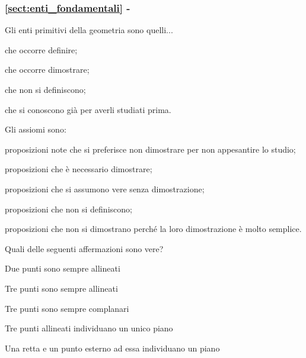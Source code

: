 \begingroup
\hypersetup{linkcolor=black}
\subsubsection*{\ref{sect:enti_fondamentali} - 
}
\endgroup

\begin{esercizio}
\label{ese:1.33}
Gli enti primitivi della geometria sono quelli...
\begin{enumeratea}
\item che occorre definire;
\item che occorre dimostrare;
\item che non si definiscono;
\item che si conoscono già per averli studiati prima.
\end{enumeratea}
\end{esercizio}

\begin{esercizio}
\label{ese:1.34}
Gli assiomi sono:
\begin{enumeratea}
\item proposizioni note che si preferisce non dimostrare per non 
appesantire lo studio;
\item proposizioni che è necessario dimostrare;
\item proposizioni che si assumono vere senza dimostrazione;
\item proposizioni che non si definiscono;
\item proposizioni che non si dimostrano perché la loro dimostrazione 
è molto semplice.
\end{enumeratea}
\end{esercizio}
	
\begin{esercizio}
\label{ese:1.35}
Quali delle seguenti affermazioni sono vere?
\begin{enumeratea}
\item Due punti sono sempre allineati		
\tab\tab\tab\tab\boxV\quad\boxF
\item Tre punti sono sempre allineati		
\tab\tab\tab\tab\boxV\quad\boxF
\item Tre punti sono sempre complanari		
\tab\tab\tab\tab\boxV\quad\boxF
\item Tre punti allineati individuano un unico piano	
\tab\tab\boxV\quad\boxF
\item Una retta e un punto esterno ad essa individuano un piano 
\tab\boxV\quad\boxF
\end{enumeratea}
\end{esercizio}


